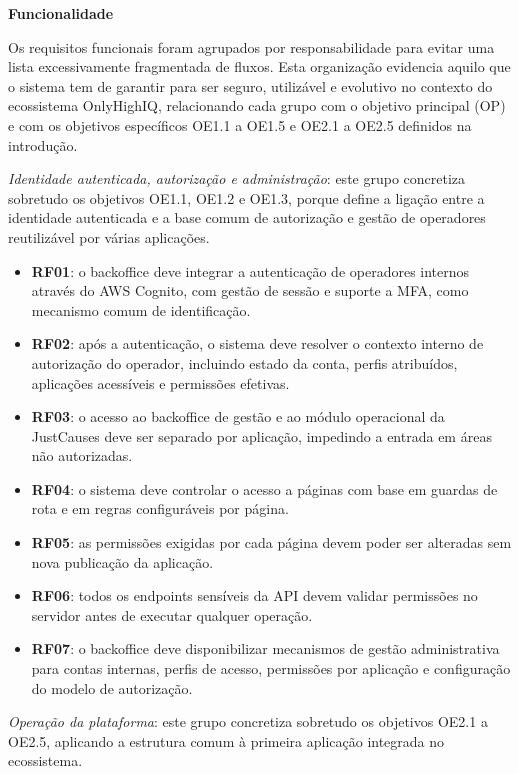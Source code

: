 \noindent\textbf{Funcionalidade}

Os requisitos funcionais foram agrupados por responsabilidade para evitar uma lista excessivamente fragmentada de fluxos. Esta organização evidencia aquilo que o sistema tem de garantir para ser seguro, utilizável e evolutivo no contexto do ecossistema OnlyHighIQ, relacionando cada grupo com o objetivo principal (OP) e com os objetivos específicos OE1.1 a OE1.5 e OE2.1 a OE2.5 definidos na introdução.

\medskip\noindent\textit{Identidade autenticada, autorização e administração}: este grupo concretiza sobretudo os objetivos OE1.1, OE1.2 e OE1.3, porque define a ligação entre a identidade autenticada e a base comum de autorização e gestão de operadores reutilizável por várias aplicações.

\begin{itemize}
  \item \textbf{RF01}: o backoffice deve integrar a autenticação de operadores internos através do AWS Cognito, com gestão de sessão e suporte a \gls{MFA}, como mecanismo comum de identificação.
  \item \textbf{RF02}: após a autenticação, o sistema deve resolver o contexto interno de autorização do operador, incluindo estado da conta, perfis atribuídos, aplicações acessíveis e permissões efetivas.
  \item \textbf{RF03}: o acesso ao backoffice de gestão e ao módulo operacional da JustCauses deve ser separado por aplicação, impedindo a entrada em áreas não autorizadas.
  \item \textbf{RF04}: o sistema deve controlar o acesso a páginas com base em guardas de rota e em regras configuráveis por página.
  \item \textbf{RF05}: as permissões exigidas por cada página devem poder ser alteradas sem nova publicação da aplicação.
  \item \textbf{RF06}: todos os endpoints sensíveis da \gls{API} devem validar permissões no servidor antes de executar qualquer operação.
  \item \textbf{RF07}: o backoffice deve disponibilizar mecanismos de gestão administrativa para contas internas, perfis de acesso, permissões por aplicação e configuração do modelo de autorização.
\end{itemize}

\medskip\noindent\textit{Operação da plataforma}: este grupo concretiza sobretudo os objetivos OE2.1 a OE2.5, aplicando a estrutura comum à primeira aplicação integrada no ecossistema.

